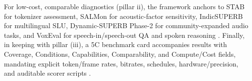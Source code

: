 For low-cost, comparable diagnostics (pillar ii), the framework anchors to STAB for tokenizer assessment, SALMon for acoustic-factor sensitivity, IndicSUPERB for multilingual SLU, Dynamic-SUPERB Phase-2 for community-expanded audio tasks, and VoxEval for speech-in/speech-out QA and spoken reasoning \cite{vashishth2024stabspeechtokenizerassessmentbenchmark,maimon2025salmonsuiteacousticlanguagemodelevaluati,entry2025indicsuperbspeechprocessinguniversalperf,huang2025dynamicsuperbphase2collaborativelyexpand,cui2025voxevalbenchmarkingknowledgeunderstandin}. Finally, in keeping with pillar (iii), a 5C benchmark card accompanies results with Coverage, Conditions, Capabilities, Comparability, and Compute/Cost fields, mandating explicit token/frame rates, bitrates, schedules, hardware/precision, and auditable scorer scripts \cite{mousavi2024dasbdiscreteaudiospeechbenchmark,cui2025voxevalbenchmarkingknowledgeunderstandin,vashishth2024stabspeechtokenizerassessmentbenchmark,entry2025indicsuperbspeechprocessinguniversalperf,maimon2025slammingtrainingspeechlanguagemodelonegp}.

